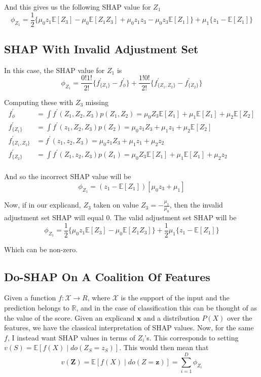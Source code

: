 \documentclass{article}
\begin{document}
And this gives us the following SHAP value for $Z_1$
\[
\phi_{Z_1} = \frac{1}{2}\Bigg\{ \mu_0 z_1\mathbb{E}[Z_3] - \mu_0 \mathbb{E}[Z_1 Z_3] + \mu_0 z_1 z_3 - \mu_0z_3 \mathbb{E}[Z_1] \Bigg\}  + \mu_1 \Bigg\{z_1 - \mathbb{E}[Z_1] \Bigg\}
\]

\subsection{SHAP With Invalid Adjustment Set}

In this case, the SHAP value for $Z_1$ is
\[
\phi_{Z_1} = \frac{0!1!}{2!}\Big\{ f^\prime_{\{Z_1\}} - f^\prime_{\phi}\Big\}  + \frac{1!0!}{2!}\Big\{f^\prime_{\{Z_1, Z_2 \}} - f^\prime_{\{Z_2 \}}\Big\}
\] 

Computing these with $Z_3$ missing 
\begin{align*}
f^\prime_{\phi} &= \int f^\prime(Z_1, Z_2, Z_3)p(Z_1, Z_2) = \mu_0 Z_3\mathbb{E}[Z_1] + \mu_1\mathbb{E}[Z_1] + \mu_2\mathbb{E}[Z_2]\\
f^\prime_{\{Z_1\}} &= \int f^\prime(z_1, Z_2, Z_3)p(Z_2) = \mu_0 z_1 Z_3 + \mu_1z_1 + \mu_2\mathbb{E}[Z_2]\\
f^\prime_{\{Z_1, Z_2\}} &= f^\prime(z_1, z_2, Z_3) = \mu_0 z_1 Z_3 + \mu_1z_1 + \mu_2 z_2\\
f^\prime_{\{Z_2\}} &= \int f^\prime(Z_1, z_2, Z_3)p(Z_1) = \mu_0 Z_3 \mathbb{E}[Z_1] + \mu_1\mathbb{E}[Z_1] + \mu_2 z_2\\
\end{align*}

And so the incorrect SHAP value will be
\[
\phi_{Z_1} = (z_1 - \mathbb{E}[Z_1])[\mu_0z_3 + \mu_1] 
\]

Now, if in our explicand, $Z_3$ taken on value $Z_3 = -\frac{\mu_1}{\mu_0}$, then the invalid adjustment set SHAP will equal $0$. The valid adjustment set SHAP will be
\[
\phi_{Z_1} = \frac{1}{2}\Big\{\mu_0z_1\mathbb{E}[Z_3] - \mu_0\mathbb{E}[Z_1Z_3] \Big\} + \frac{1}{2}\mu_1\{z_1 - \mathbb{E}[Z_1] \}
\]

Which can be non-zero.

\subsection{Do-SHAP On A Coalition Of Features}
Given a function $f: \mathcal{X} \rightarrow R$, where $\mathcal{X}$ is the support of the input and the prediction belongs to $\mathbb{R}$, and in the case of classification this can be thought of as the value of the score. Given an explicand $\mathbf{x}$ and a distribution $P(X)$ over the features, we have the classical interpretation of SHAP values. Now, for the same $f$, I instead want SHAP values in terms of $Z_i$'s. This corresponds to setting $v(S) = \mathbb{E}[f(X) \mid do(Z_S = z_S)]$. This would then mean that
\[
v(\mathbf{Z}) = \mathbb{E}[f(X) \mid do(Z = \mathbf{z})] = \sum_{i = 1}^D \phi_{Z_i}
\]
\end{document}
